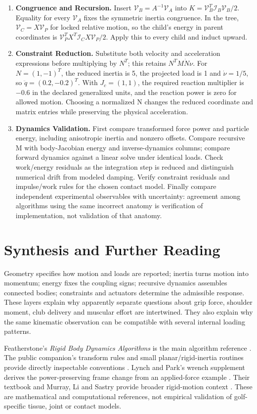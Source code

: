 \begin{enumerate}
\item \textbf{Congruence and Recursion.} Insert $\mathcal V_B=A^{-1}\mathcal V_A$ into $K=\mathcal V_B^T\mathcal I_B\mathcal V_B/2$. Equality for every $\mathcal V_A$ fixes the symmetric inertia congruence. In the tree, $\mathcal V_C=X\mathcal V_P$ for locked relative motion, so the child's energy in parent coordinates is $\mathcal V_P^TX^T\mathcal I_CX\mathcal V_P/2$. Apply this to every child and induct upward.
\item \textbf{Constraint Reduction.} Substitute both velocity and acceleration expressions before multiplying by $N^T$; this retains $N^TM\dot N\nu$. For $N=(1,-1)^T$, the reduced inertia is 5, the projected load is 1 and $\dot\nu=1/5$, so $\ddot q=(0.2,-0.2)^T$. With $J_c=(1,1)$, the required reaction multiplier is $-0.6$ in the declared generalized units, and the reaction power is zero for allowed motion. Choosing a normalized N changes the reduced coordinate and matrix entries while preserving the physical acceleration.
\item \textbf{Dynamics Validation.} First compare transformed force power and particle energy, including anisotropic inertia and nonzero offsets. Compare recursive M with body-Jacobian energy and inverse-dynamics columns; compare forward dynamics against a linear solve under identical loads. Check work/energy residuals as the integration step is reduced and distinguish numerical drift from modeled damping. Verify constraint residuals and impulse/work rules for the chosen contact model. Finally compare independent experimental observables with uncertainty: agreement among algorithms using the same incorrect anatomy is verification of implementation, not validation of that anatomy.
\end{enumerate}

\section{Synthesis and Further Reading}
\label{sec:ch8_summary}
\label{sec:further_reading_ch8}

Geometry specifies how motion and loads are reported; inertia turns motion into momentum; energy fixes the coupling signs; recursive dynamics assembles connected bodies; constraints and actuators determine the admissible response. These layers explain why apparently separate questions about grip force, shoulder moment, club delivery and muscular effort are intertwined. They also explain why the same kinematic observation can be compatible with several internal loading patterns.

Featherstone's \emph{Rigid Body Dynamics Algorithms} is the main algorithm reference \cite{Featherstone2008}. The public companion's transform rules and small planar/rigid-inertia routines provide directly inspectable conventions \cite{FeatherstoneSpatialV1Review}. Lynch and Park's wrench supplement derives the power-preserving frame change from an applied-force example \cite{MRWrenchSpatialSupplement}. Their textbook and Murray, Li and Sastry provide broader rigid-motion context \cite{Lynch2017,Murray1994}. These are mathematical and computational references, not empirical validation of golf-specific tissue, joint or contact models.
